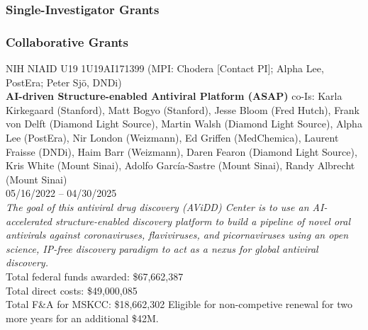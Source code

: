 \documentclass[10pt]{article}
\begin{document}
\subsubsection*{Single-Investigator Grants}



\subsubsection*{Collaborative Grants}

NIH NIAID U19 1U19AI171399 (MPI: Chodera [Contact PI]; Alpha Lee, PostEra; Peter Sj\"{o}, DNDi) \\
{\bf AI-driven Structure-enabled Antiviral Platform (ASAP)}
co-Is: Karla Kirkegaard (Stanford), Matt Bogyo (Stanford), Jesse Bloom (Fred Hutch), Frank von Delft (Diamond Light Source), Martin Walsh (Diamond Light Source), Alpha Lee (PostEra), Nir London (Weizmann), Ed Griffen (MedChemica), Laurent Fraisse (DNDi), Haim Barr (Weizmann), Daren Fearon (Diamond Light Source), Kris White (Mount Sinai), Adolfo Garc\'{i}a-Sastre (Mount Sinai), Randy Albrecht (Mount Sinai) \\
05/16/2022 -- 04/30/2025\\
\emph{The goal of this antiviral drug discovery (AViDD) Center is to use an AI-accelerated structure-enabled discovery platform to build a pipeline of novel oral antivirals against coronaviruses, flaviviruses, and picornaviruses using an open science, IP-free discovery paradigm to act as a nexus for global antiviral discovery.}\\
Total federal funds awarded: \$67,662,387\\
Total direct costs: \$49,000,085\\
Total F\&A for MSKCC: \$18,662,302
Eligible for non-competive renewal for two more years for an additional \$42M.
\end{document}
